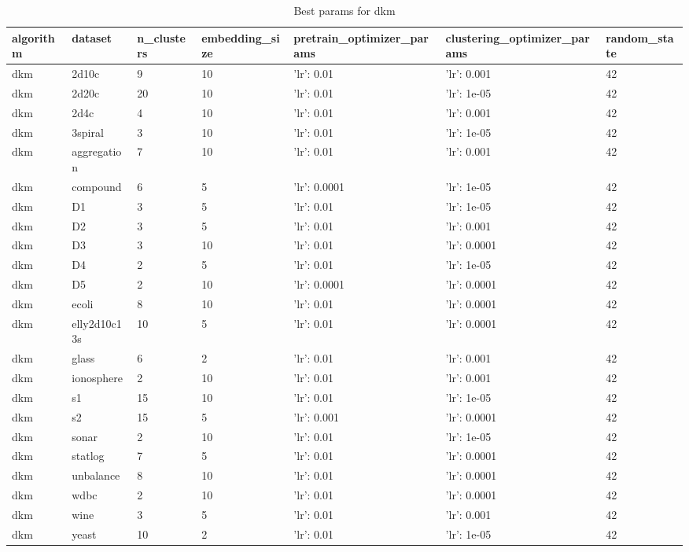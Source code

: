 \begin{table}[H]
\centering
\caption{Best params for dkm}
\label{tab:params:dkm}
\begin{tabular}{|l|l|l|l|l|l|l|}
\hline
algorithm & dataset & n\_clusters & embedding\_size & pretrain\_optimizer\_params & clustering\_optimizer\_params & random\_state \\
\hline
dkm & 2d10c & 9 & 10 & {'lr': 0.01} & {'lr': 0.001} & 42 \\
\hline
dkm & 2d20c & 20 & 10 & {'lr': 0.01} & {'lr': 1e-05} & 42 \\
\hline
dkm & 2d4c & 4 & 10 & {'lr': 0.01} & {'lr': 0.001} & 42 \\
\hline
dkm & 3spiral & 3 & 10 & {'lr': 0.01} & {'lr': 1e-05} & 42 \\
\hline
dkm & aggregation & 7 & 10 & {'lr': 0.01} & {'lr': 0.001} & 42 \\
\hline
dkm & compound & 6 & 5 & {'lr': 0.0001} & {'lr': 1e-05} & 42 \\
\hline
dkm & D1 & 3 & 5 & {'lr': 0.01} & {'lr': 1e-05} & 42 \\
\hline
dkm & D2 & 3 & 5 & {'lr': 0.01} & {'lr': 0.001} & 42 \\
\hline
dkm & D3 & 3 & 10 & {'lr': 0.01} & {'lr': 0.0001} & 42 \\
\hline
dkm & D4 & 2 & 5 & {'lr': 0.01} & {'lr': 1e-05} & 42 \\
\hline
dkm & D5 & 2 & 10 & {'lr': 0.0001} & {'lr': 0.0001} & 42 \\
\hline
dkm & ecoli & 8 & 10 & {'lr': 0.01} & {'lr': 0.0001} & 42 \\
\hline
dkm & elly2d10c13s & 10 & 5 & {'lr': 0.01} & {'lr': 0.0001} & 42 \\
\hline
dkm & glass & 6 & 2 & {'lr': 0.01} & {'lr': 0.001} & 42 \\
\hline
dkm & ionosphere & 2 & 10 & {'lr': 0.01} & {'lr': 0.001} & 42 \\
\hline
dkm & s1 & 15 & 10 & {'lr': 0.01} & {'lr': 1e-05} & 42 \\
\hline
dkm & s2 & 15 & 5 & {'lr': 0.001} & {'lr': 0.0001} & 42 \\
\hline
dkm & sonar & 2 & 10 & {'lr': 0.01} & {'lr': 1e-05} & 42 \\
\hline
dkm & statlog & 7 & 5 & {'lr': 0.01} & {'lr': 0.0001} & 42 \\
\hline
dkm & unbalance & 8 & 10 & {'lr': 0.01} & {'lr': 0.0001} & 42 \\
\hline
dkm & wdbc & 2 & 10 & {'lr': 0.01} & {'lr': 0.0001} & 42 \\
\hline
dkm & wine & 3 & 5 & {'lr': 0.01} & {'lr': 0.001} & 42 \\
\hline
dkm & yeast & 10 & 2 & {'lr': 0.01} & {'lr': 1e-05} & 42 \\
\hline
\end{tabular}
\end{table}